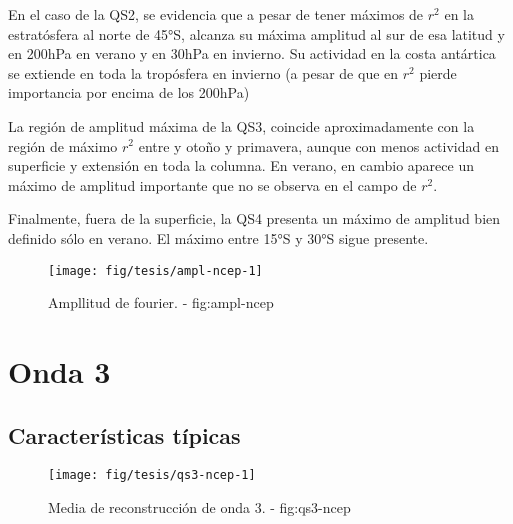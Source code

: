 \documentclass[spanish,a4paper]{book}
\begin{document}
En el caso de la QS2, se evidencia que a pesar de tener máximos de
\(r^2\) en la estratósfera al norte de 45°S, alcanza su máxima amplitud
al sur de esa latitud y en 200hPa en verano y en 30hPa en invierno. Su
actividad en la costa antártica se extiende en toda la tropósfera en
invierno (a pesar de que en \(r^2\) pierde importancia por encima de los
200hPa)

La región de amplitud máxima de la QS3, coincide aproximadamente con la
región de máximo \(r^2\) entre y otoño y primavera, aunque con menos
actividad en superficie y extensión en toda la columna. En verano, en
cambio aparece un máximo de amplitud importante que no se observa en el
campo de \(r^2\).

Finalmente, fuera de la superficie, la QS4 presenta un máximo de
amplitud bien definido sólo en verano. El máximo entre 15°S y 30°S sigue
presente.

\begin{landscape}\begin{figure}

{\centering \texttt{[image: fig/tesis/ampl-ncep-1]} 

}

\caption{Ampllitud de fourier. - fig:ampl-ncep}\label{fig:ampl-ncep}
\end{figure}
\end{landscape}


\chapter{Onda 3}\label{onda-3}


\section{Características típicas}\label{caracteristicas-tipicas}

\begin{figure*}
\texttt{[image: fig/tesis/qs3-ncep-1]} \caption{Media de reconstrucción de onda 3. - fig:qs3-ncep}\label{fig:qs3-ncep}
\end{figure*}
\end{document}
